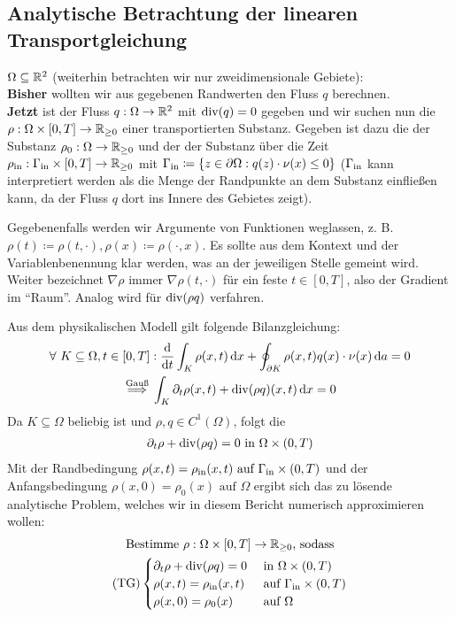 
\subsection{Analytische Betrachtung der linearen Transportgleichung}
$ \Omega \subseteq \mathbb{R}^2 $ (weiterhin betrachten wir nur zweidimensionale Gebiete):\\
\textbf{Bisher} wollten wir aus gegebenen Randwerten den Fluss $ q $ berechnen.\\
\textbf{Jetzt} ist  der Fluss $ q: \Omega \to \mathbb{R}^2 $ mit $ \operatorname{div}(q) = 0 $ gegeben und wir suchen nun die  $ \rho: \Omega \times [0,T] \to \mathbb{R}_{\geq 0} $ einer 
transportierten Substanz. Gegeben ist dazu die  der Substanz $ \rho_0:  \Omega \to \mathbb{R}_{\geq 0}$ und der  der Substanz über die Zeit $ \rho_{\text{in}}: \Gamma_{{\text{in}}} \times [0,T] \to \mathbb{R}_{\geq 0} $ mit $ \Gamma_{{\text{in}}} \coloneqq \{ z \in \partial \Omega: q(z) \cdot \nu(x) \leq 0 \} $ ($ \Gamma_{{\text{in}}} $ kann interpretiert werden als die Menge der Randpunkte an dem Substanz einfließen kann, da der Fluss $ q $ dort ins Innere des Gebietes zeigt).

Gegebenenfalls werden wir Argumente von Funktionen weglassen, z. B. $ \rho(t) \coloneqq \rho(t,\cdot), \rho(x) \coloneqq \rho(\cdot, x) $. Es sollte aus dem Kontext und der Variablenbenennung klar werden, was an der jeweiligen Stelle gemeint wird. Weiter bezeichnet $ \nabla \rho $ immer $ \nabla \rho(t,\cdot) $ für ein feste $ t \in [0,T] $, also der Gradient  im \enquote{Raum}. Analog wird für $ \operatorname{div}(\rho q) $ verfahren.

Aus dem physikalischen Modell gilt folgende Bilanzgleichung:
\begin{gather*}
	\forall \ K \subseteq \Omega, t \in [0,T]: \frac{\mathop{}\!\mathrm{d}}{\mathop{}\!\mathrm{d} t} \int_K \rho(x,t) \mathop{}\!\mathrm{d} x + \oint_{\partial K} \rho(x,t) q(x) \cdot \nu(x) \mathop{}\!\mathrm{d} a = 0 \\
	\stackrel{\text{Gauß}}{\implies} \int_K \partial_t \rho(x,t) + \operatorname{div}(\rho q)(x,t) \mathop{}\!\mathrm{d} x = 0 
\end{gather*}
Da $ K \subseteq \Omega $ beliebig ist und $ \rho, q \in C^1(\Omega) $, folgt die 
\begin{gather*}
	\partial_t \rho + \operatorname{div}(\rho q) = 0 \text{ in } \Omega \times (0,T) 
\end{gather*}
Mit der Randbedingung $ \rho(x,t) = \rho_{\text{in}}(x,t) \text{ auf } \Gamma_{{\text{in}}} \times (0,T)$ und der Anfangsbedingung $ \rho(x,0) = \rho_0(x) \text{ auf } \Omega $ ergibt sich das zu lösende analytische Problem, welches wir in diesem Bericht numerisch approximieren wollen:
\begin{gather*}
	\text{Bestimme } \rho: \Omega \times [0,T] \to \mathbb{R}_{\geq 0} \text{, sodass}\\
	\operatorname{(TG)}
	\begin{cases}
		\partial_t \rho + \operatorname{div}(\rho q) = 0 &\text{ in } \Omega \times (0,T)\\
		\rho(x,t) = \rho_{\text{in}}(x,t) &\text{ auf } \Gamma_{{\text{in}}} \times (0,T)\\
		\rho(x,0) = \rho_0(x) &\text{ auf } \Omega
	\end{cases}
\end{gather*}


